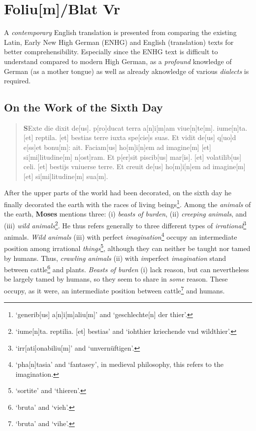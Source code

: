 \documentclass[
]{article}
\author{Dietmar Gerald Schrausser}
\date{09.05.2026}
\begin{document}
\hypertarget{foliumblat-vr}{%
\section{Foliu{[}m{]}/Blat Vr}\label{foliumblat-vr}}

A \emph{contemporary} English translation is presented from comparing
the existing Latin, Early New High German (ENHG) and English
(translation) texts for better comprehensibility. Especially since the
ENHG text is difficult to understand compared to modern High German, as
a \emph{profound} knowledge of German (as a mother tongue) as well as
already aknowledge of various \emph{dialects} is required.

\hypertarget{on-the-work-of-the-sixth-day}{%
\subsection{On the Work of the Sixth
Day}\label{on-the-work-of-the-sixth-day}}

\begin{quote}
\textbf{S}Exte die dixit de{[}us{]}. p{[}ro{]}ducat terra
a{[}n{]}i{[}m{]}am viue{[}n{]}te{[}m{]}. iume{[}n{]}ta. {[}et{]}
reptila. {[}et{]} bestias terre iuxta spe{[}cie{]}s suas. Et vidit
de{[}us{]} q{[}uo{]}d e{[}ss{]}et bonu{[}m{]}: ait. Faciam{[}us{]}
ho{[}m{]}i{[}n{]}em ad imagine{[}m{]} {[}et{]} si{[}mi{]}litudine{[}m{]}
n{[}ost{]}ram. Et p{[}er{]}sit piscib{[}us{]} mar{[}is{]}. {[}et{]}
volatilib{[}us{]} celi. {[}et{]} bestijs vniuerse terre. Et creuit
de{[}us{]} ho{[}m{]}i{[}n{]}em ad imagine{[}m{]} {[}et{]}
si{[}mi{]}litudine{[}m{]} sua{[}m{]}.
\end{quote}

After the upper parts of the world had been decorated, on the sixth day
he finally decorated the earth with the races of living
beings\footnote{`generib{[}us{]} a{[}n{]}i{[}m{]}aliu{[}m{]}' and
  `geschlechte{[}n{]} der thier'.}. Among the \emph{animals} of the
earth, \textbf{Moses} mentions three: (i) \emph{beasts of burden}, (ii)
\emph{creeping animals}, and (iii) \emph{wild animals}\footnote{`iume{[}n{]}ta.
  reptilia. {[}et{]} bestias' and `iohthier kriechende vnd wildthier'.}.
He thus refers generally to three different types of
\emph{irrational}\footnote{`irr{[}ati{]}onabiliu{[}m{]}' and
  `unvernüftigen'.} animals. \emph{Wild animals} (iii) with perfect
\emph{imagination}\footnote{`pha{[}n{]}tasia' and `fantasey', in
  medieval philosophy, this refers to the imagination.} occupy an
intermediate position among irrational \emph{things}\footnote{`sortite'
  and `thieren'.}, although they can neither be taught nor tamed by
humans. Thus, \emph{crawling animals} (ii) with \emph{im}perfect
\emph{imagination} stand between cattle\footnote{`bruta' and `vieh'.}
and plants. \emph{Beasts of burden} (i) lack reason, but can
nevertheless be largely tamed by humans, so they seem to share in
\emph{some} reason. These occupy, as it were, an intermediate position
between cattle\footnote{`bruta' and `vihe'.} and humans.
\end{document}
